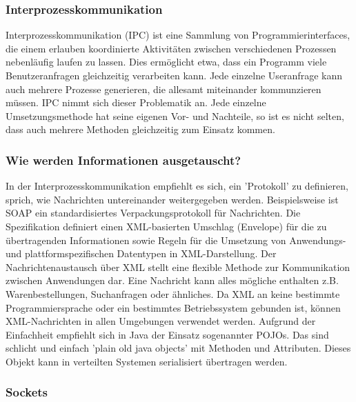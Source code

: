 \documentclass[letterpaper, 12pt]{article}
\let\tempsubsubsection\subsubsection
\renewcommand\subsubsection[1]{\vspace{0cm}\tempsubsubsection{#1}\vspace{0cm}}
\begin{document}
\subsubsection{Interprozesskommunikation}

Interprozesskommunikation (IPC) ist eine Sammlung von Programmierinterfaces, die einem erlauben koordinierte Aktivitäten zwischen verschiedenen Prozessen nebenläufig laufen zu lassen. Dies ermöglicht etwa, dass ein Programm viele Benutzeranfragen gleichzeitig verarbeiten kann. Jede einzelne Useranfrage kann auch mehrere Prozesse generieren, die allesamt miteinander kommunzieren müssen. IPC nimmt sich dieser Problematik an. Jede einzelne Umsetzungsmethode hat seine eigenen Vor- und Nachteile, so ist es nicht selten, dass auch mehrere Methoden gleichzeitig zum Einsatz kommen. \cite{ipc}

\subsubsection{Wie werden Informationen ausgetauscht?}

In der Interprozesskommunikation empfiehlt es sich, ein 'Protokoll' zu definieren, sprich, wie Nachrichten untereinander weitergegeben werden. Beispielsweise ist SOAP ein standardisiertes Verpackungsprotokoll für Nachrichten. Die Spezifikation definiert einen XML-basierten Umschlag (Envelope) für die zu übertragenden Informationen sowie Regeln für die Umsetzung von Anwendungs- und plattformspezifischen Datentypen in XML-Darstellung. Der Nachrichtenaustausch über XML stellt eine flexible Methode zur Kommunikation zwischen Anwendungen dar. Eine Nachricht kann alles mögliche enthalten z.B. Warenbestellungen, Suchanfragen oder ähnliches. Da XML an keine bestimmte Programmiersprache oder ein bestimmtes Betriebssystem gebunden ist, können XML-Nachrichten in allen Umgebungen verwendet werden. Aufgrund der Einfachheit empfiehlt sich in Java der Einsatz sogenannter POJOs. Das sind schlicht und einfach 'plain old java objects' mit Methoden und Attributen. Dieses Objekt kann in verteilten Systemen serialisiert übertragen werden. \cite{ausarbeitungsoa}

\subsubsection{Sockets}
\end{document}
